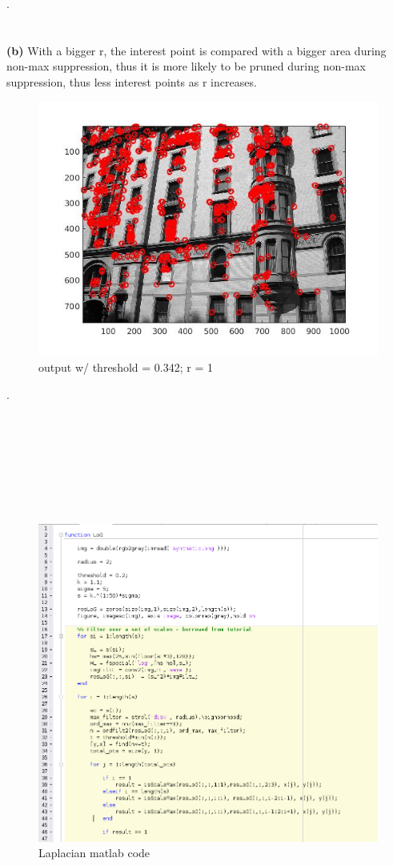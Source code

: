 \documentclass[]{article}
\begin{document}
.\\\\\\
\textbf{(b)}
With a bigger r, the interest point is compared with a bigger area during non-max suppression, thus it is more likely to be pruned during non-max suppression, thus less interest points as r increases.
\begin{figure}[h!]
\centering
\includegraphics[width=1.35\textwidth]{img/1a-2.jpg}
\caption{output w/ threshold = 0.342; r = 1}
\end{figure}

.\\\\\\\\\\\\\\\\
\begin{figure}[h!]
\centering
\includegraphics[width=1.35\textwidth]{img/1c1-code.png}
\caption{Laplacian matlab code}
\end{figure}
\end{document}
